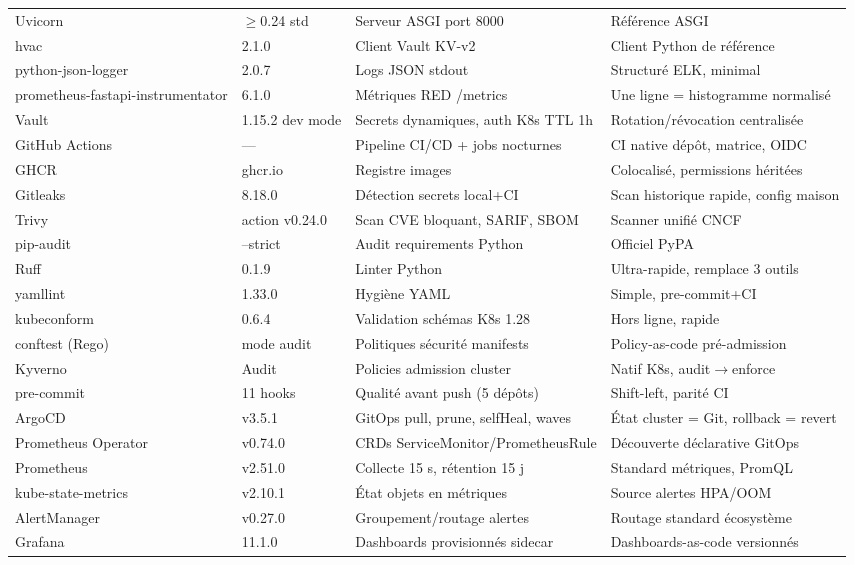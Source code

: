 \documentclass[12pt,a4paper,twoside,openright]{report}
\begin{document}
{\begin{longtable}{@{}p{3.0cm}p{1.9cm}p{4.7cm}p{4.7cm}@{}}
Uvicorn & $\geq$0.24 std & Serveur ASGI port 8000 & Référence ASGI \\
hvac & 2.1.0 & Client Vault KV-v2 & Client Python de référence \\
python-json-logger & 2.0.7 & Logs JSON stdout & Structuré ELK, minimal \\
prometheus-fastapi-instrumentator & 6.1.0 & Métriques RED /metrics & Une ligne = histogramme normalisé \\
Vault & 1.15.2 dev mode & Secrets dynamiques, auth K8s TTL 1h & Rotation/révocation centralisée \\
GitHub Actions & --- & Pipeline CI/CD + jobs nocturnes & CI native dépôt, matrice, OIDC \\
GHCR & ghcr.io & Registre images & Colocalisé, permissions héritées \\
Gitleaks & 8.18.0 & Détection secrets local+CI & Scan historique rapide, config maison \\
Trivy & action v0.24.0 & Scan CVE bloquant, SARIF, SBOM & Scanner unifié CNCF \\
pip-audit & --strict & Audit requirements Python & Officiel PyPA \\
Ruff & 0.1.9 & Linter Python & Ultra-rapide, remplace 3 outils \\
yamllint & 1.33.0 & Hygiène YAML & Simple, pre-commit+CI \\
kubeconform & 0.6.4 & Validation schémas K8s 1.28 & Hors ligne, rapide \\
conftest (Rego) & mode audit & Politiques sécurité manifests & Policy-as-code pré-admission \\
Kyverno & Audit & Policies admission cluster & Natif K8s, audit$\rightarrow$enforce \\
pre-commit & 11 hooks & Qualité avant push (5 dépôts) & Shift-left, parité CI \\
ArgoCD & v3.5.1 & GitOps pull, prune, selfHeal, waves & État cluster = Git, rollback = revert \\
Prometheus Operator & v0.74.0 & CRDs ServiceMonitor/PrometheusRule & Découverte déclarative GitOps \\
Prometheus & v2.51.0 & Collecte 15 s, rétention 15 j & Standard métriques, PromQL \\
kube-state-metrics & v2.10.1 & État objets en métriques & Source alertes HPA/OOM \\
AlertManager & v0.27.0 & Groupement/routage alertes & Routage standard écosystème \\
Grafana & 11.1.0 & Dashboards provisionnés sidecar & Dashboards-as-code versionnés \\

\end{longtable}}
\end{document}
